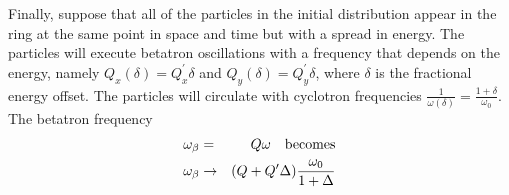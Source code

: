 


Finally, suppose that all of the particles in the initial distribution appear in the ring at the
same point in space and time but with a spread in energy. The particles will execute betatron
oscillations with a frequency that depends on the energy, namely $Q_x(\delta) = Q^\prime_x\delta$
and $Q_y(\delta) = Q_y^\prime \delta$, where $\delta$ is the fractional energy offset. 
The particles will circulate with cyclotron frequencies
$\frac{1}{\omega(\delta)} = \frac{1+\delta}{\omega_0}$.
The betatron frequency
\begin{eqnarray*}
\omega_\beta &=& Q\omega \ \ \ {\rm becomes} \\
\omega_\beta &\rightarrow& (Q+Q^\prime\Delta)\frac{\omega_0}{1+\Delta}\\  
\end{eqnarray*}

